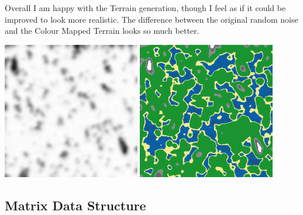 \begin{flushleft}
            Overall I am happy with the Terrain generation, though I feel as if it could be improved to look more realistic.
            The difference between the original random noise and the Colour Mapped Terrain looks so much better.

            \begin{center}
                \includegraphics[width=6cm]{Images/Prototype/Seed420 Grayscale.png}
                \includegraphics[width=6cm]{Images/Prototype/Seed420 Colour.png} 
            \end{center}
            
            \vspace{1cm}
            \subsection{Matrix Data Structure}
            \vspace{0.25cm}


\end{flushleft}
